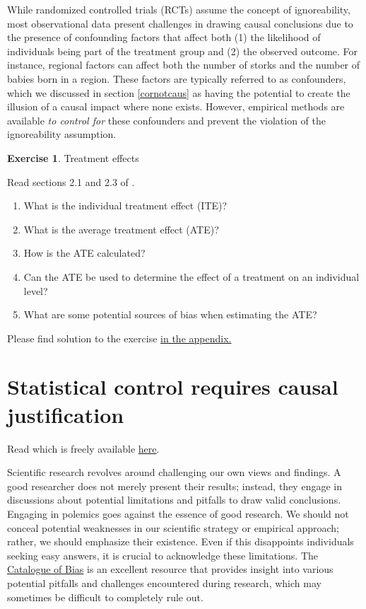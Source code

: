 \documentclass[
  12pt,
  oneside]{book}
\providecommand{\tightlist}{%
  \setlength{\itemsep}{0pt}\setlength{\parskip}{0pt}}
\theoremstyle{definition}
\theoremstyle{definition}
\theoremstyle{definition}
\newtheorem{exercise}{Exercise}[chapter]
\theoremstyle{definition}
\theoremstyle{remark}
\begin{document}
While randomized controlled trials (RCTs) assume the concept of ignoreability, most observational data present challenges in drawing causal conclusions due to the presence of confounding factors that affect both (1) the likelihood of individuals being part of the treatment group and (2) the observed outcome. For instance, regional factors can affect both the number of storks and the number of babies born in a region. These factors are typically referred to as confounders, which we discussed in section \ref{cornotcaus} as having the potential to create the illusion of a causal impact where none exists. However, empirical methods are available \emph{to control for} these confounders and prevent the violation of the ignoreability assumption.

\begin{exercise}
\protect\hypertarget{exr:treatmenteffects}{}\label{exr:treatmenteffects}Treatment effects

Read sections 2.1 and 2.3 of \citet{Neal2020Introduction}.

\begin{enumerate}
\def\labelenumi{\arabic{enumi}.}
\tightlist
\item
  What is the individual treatment effect (ITE)?
\item
  What is the average treatment effect (ATE)?
\item
  How is the ATE calculated?
\item
  Can the ATE be used to determine the effect of a treatment on an individual level?
\item
  What are some potential sources of bias when estimating the ATE?
\end{enumerate}

Please find solution to the exercise \protect\hyperlink{sol:treatmenteffects}{in the appendix.}
\end{exercise}

\hypertarget{statistical-control-requires-causal-justification}{%
\section{Statistical control requires causal justification}\label{statistical-control-requires-causal-justification}}

Read \citet{Wysocki2022Statistical} which is freely available \href{https://doi.org/10.1177/25152459221095823}{here}.

Scientific research revolves around challenging our own views and findings. A good researcher does not merely present their results; instead, they engage in discussions about potential limitations and pitfalls to draw valid conclusions. Engaging in polemics goes against the essence of good research. We should not conceal potential weaknesses in our scientific strategy or empirical approach; rather, we should emphasize their existence. Even if this disappoints individuals seeking easy answers, it is crucial to acknowledge these limitations. The \href{https://catalogofbias.org/biases/}{Catalogue of Bias} is an excellent resource that provides insight into various potential pitfalls and challenges encountered during research, which may sometimes be difficult to completely rule out.
\end{document}
